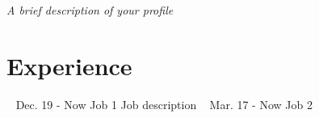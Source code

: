 \documentclass[american]{cv-class}
\begin{document}
\justifying
	\begin{small}
		\textit{
			A brief description of your profile
		}
	\end{small}

\section{Experience}
\begin{entrylist}
	~ 
    \entry
	{Dec. 19 - Now}
	{Job 1}
	{\href{https://yourCompany.com/}{ }}
	{\justifying Job description}
	~ 
    \entry
	{Mar. 17 - Now}
	{Job 2}
	{\href{https://yourCompany.com/}{ }}

\end{entrylist}
\end{document}
